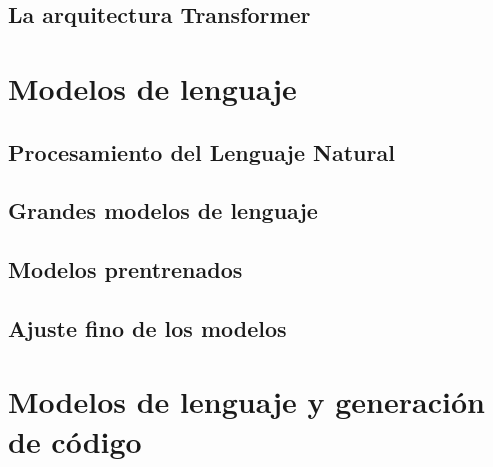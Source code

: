 \subsection{La arquitectura Transformer}

\section{Modelos de lenguaje}

\subsection{Procesamiento del Lenguaje Natural}
\subsection{Grandes modelos de lenguaje}
\subsection{Modelos prentrenados}
\subsection{Ajuste fino de los modelos}

\section{Modelos de lenguaje y generación de código}

